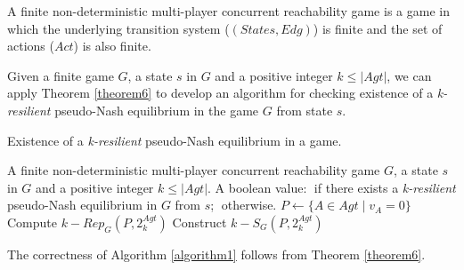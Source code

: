 A finite non-deterministic multi-player concurrent reachability game is a game in which the underlying transition system ($(States, Edg)$) is finite and the set of actions ($Act$) is also finite.

Given a finite game $G$, a state $s$ in $G$ and a positive integer $k \leq \vert Agt \vert$, we can apply Theorem \ref{theorem6} to develop an algorithm for checking existence of a \textit{k-resilient} pseudo-Nash equilibrium in the game $G$ from state $s$.

\begin{algorithm}
\caption{Existence of a \textit{k-resilient} pseudo-Nash equilibrium in a game.}
\label{algorithm1}
\begin{algorithmic}[1]
\renewcommand{\algorithmicrequire}{\textbf{Input:}}
\renewcommand{\algorithmicensure}{\textbf{Output:}}
\REQUIRE A finite non-deterministic multi-player concurrent reachability game $G$, a state $s$ in $G$ and a positive integer $k \leq \vert Agt \vert$.
\ENSURE A boolean value: \TRUE $\;$if there exists a \textit{k-resilient} pseudo-Nash equilibrium in $G$ from $s$; \FALSE $\;$otherwise.
\STATE $P \leftarrow \lbrace A \in Agt \; \vert \; v_{A} = 0 \rbrace$
\STATE Compute $k-Rep_{G}(P, 2^{Agt}_{k})$
\STATE Construct $k-S_{G}(P, 2^{Agt}_{k})$
\RETURN \TRUE
\ENDIF
\ENDFOR
\ENDFOR
\RETURN \FALSE
\end{algorithmic}
\end{algorithm}

The correctness of Algorithm \ref{algorithm1} follows from Theorem \ref{theorem6}.

